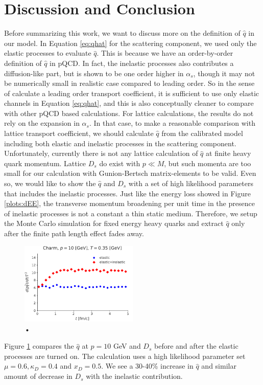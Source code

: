 \documentclass[aps, prc, reprint, amsmath, groupedaddress, nofootinbib]{revtex4-1}
\begin{document}
\section{Discussion and Conclusion}\label{section:conclusion}
Before summarizing this work, we want to discuss more on the definition of $\hat{q}$ in our model.
In Equation \ref{eq:qhat} for the scattering component, we used only the elastic processes to evaluate $\hat{q}$.
This is because we have an order-by-order definition of $\hat{q}$ in pQCD.
In fact, the inelastic processes also contributes a diffusion-like part, but is shown to be one order higher in $\alpha_s$, though it may not be numerically small in realistic case compared to leading order.
So in the sense of calculate a leading order transport coefficient, it is sufficient to use only elastic channels in Equation \ref{eq:qhat}, and this is also conceptually cleaner to compare with other pQCD based calculations.
For lattice calculations, the results do not rely on the expansion in $\alpha_s$.
In that case, to make a reasonable comparison with lattice transport coefficient, we should calculate $\hat{q}$ from the calibrated model including both elastic and inelastic processes in the scattering component.
Unfortunately, currently there is not any lattice calculation of $\hat{q}$ at finite heavy quark momentum.  
Lattice $D_s$ do exist with $p \ll M$, but such momenta are too small for our calculation with Gunion-Bertsch matrix-elements to be valid.
Even so, we would like to show the $\hat{q}$ and $D_s$ with a set of high likelihood parameters that includes the inelastic processes.
Just like the energy loss showed in Figure \ref{plots:dEE}, the transverse momentum broadening per unit time in the presence of inelastic processes is not a constant a thin static medium.
Therefore, we setup the Monte Carlo simulation for fixed energy heavy quarks and extract $\hat{q}$ only after the finite path length effect fades away. 
\begin{figure}
\includegraphics[width=0.5\textwidth]{qhat_full.pdf}
\caption{•}\label{plots:transport_full}
\end{figure}
Figure \ref{plots:transport_full} compares the $\hat{q}$ at $p=10$ GeV and $D_s$ before and after the elastic processes are turned on.
The calculation uses a high likelihood parameter set $\mu = 0.6, \kappa_D = 0.4$ and $x_D = 0.5$. 
We see a 30-40\% increase in $\hat{q}$ and similar amount of decrease in $D_s$ with the inelastic contribution.
\end{document}
